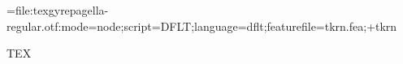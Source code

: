 
\font\pagella={file:texgyrepagella-regular.otf:mode=node;script=DFLT;language=dflt;featurefile=tkrn.fea;+tkrn}\pagella

TEX
\bye

